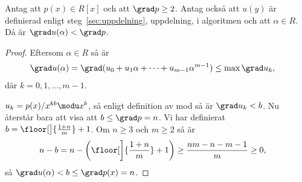 \begin{lemma}
  \label{lemma:1}
  Antag att $p(x) \in R[x]$ och att $\grad p \geq 2$. Antag också att $u(y)$ är
  definierad enligt steg~\ref{sec:uppdelning}, uppdelning, i algoritmen och att
  $\alpha \in R$. Då är $\grad u(\alpha) < \grad p$.
\end{lemma}
\begin{proof}
  Eftersom $\alpha \in R$ så är
  \begin{align*}
    \grad u(\alpha) &= \grad (u_0 + u_1 \alpha + \cdots + u_{m-1}\alpha^{m-1}) \leq \max \grad u_k,
  \end{align*}
  där $k={0,1,\dots,m-1}$.

  \bigskip\noindent
  $u_k = p(x)/x^{k b} \modu x^b$, så enligt definition av mod så är $\grad u_k
  < b$. Nu återstår bara att visa att $b \leq \grad p = n$. Vi har definierat $b =
  \floor[\big]{\frac{1 + n}{m}} + 1$. Om $n \geq 3$ och $m \geq 2$ så är
  \begin{align*}
    n-b &= n - \left( \floor[\bigg]{\frac{1 + n}{m}} + 1 \right) \geq \frac{nm-n-m-1}{m} \geq 0,
  \end{align*}
  så $\grad u(\alpha) < b \leq \grad p(x) = n$.
\end{proof}


